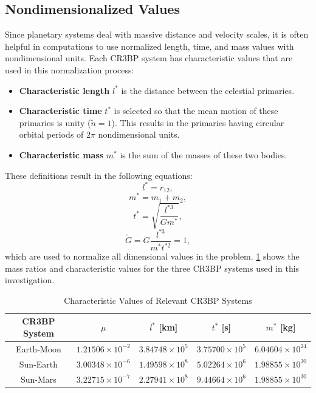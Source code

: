 \subsection{Nondimensionalized Values}
Since planetary systems deal with massive distance and velocity scales, it is often helpful in
computations to use normalized length, time, and mass values with nondimensional units. Each CR3BP
system has characteristic values that are used in this normalization process:
\begin{itemize}
    \item \textbf{Characteristic length} $l^{*}$ is the distance between the celestial primaries.
    \item \textbf{Characteristic time} $t^{*}$ is selected so that the mean motion of these
    primaries is unity ($\tilde{n}=1$). This results in the primaries having circular orbital
    periods of $2\pi$ nondimensional units.
    \item \textbf{Characteristic mass} $m^{*}$ is the sum of the masses of these two bodies.
\end{itemize}
These definitions result in the following equations:
\begin{equation}
    l^{*}=r_{12},
    \label{eq:lstar}
\end{equation}
\begin{equation}
    m^{*}=m_{1}+m_{2},
    \label{eq:mstar}
\end{equation}
\begin{equation}
    t^{*}=\sqrt{\frac{l^{*3}}{Gm^{*}}},
    \label{eq:tstar}
\end{equation}
\begin{equation}
    \tilde{G}=G\frac{l^{*3}}{m^{*}t^{*2}}=1,
    \label{eq:gstar}
\end{equation}
which are used to normalize all dimensional values in the problem. \cref{tab:charValues} shows the
mass ratios and characteristic values for the three CR3BP systems used in this investigation.

\begin{table}[ht]
    \centering
    \caption{Characteristic Values of Relevant CR3BP Systems}
    \begin{tabular}{|c|c|c|c|c|}
        \hline
        \textbf{CR3BP System}   &   \boldmath$\mu$          &   \boldmath$l^{*}$ \textbf{[km]}  &   \boldmath$t^{*}$ \textbf{[s]}   &   \boldmath$m^{*}$ \textbf{[kg]}  \\  \hline
        Earth-Moon              &   $1.21506\times10^{-2}$  &   $3.84748\times10^{5}$           &   $3.75700\times10^{5}$           &   $6.04604\times10^{24}$          \\  \hline
        Sun-Earth               &   $3.00348\times10^{-6}$  &   $1.49598\times10^{8}$           &   $5.02264\times10^{6}$           &   $1.98855\times10^{30}$          \\  \hline
        Sun-Mars                &   $3.22715\times10^{-7}$  &   $2.27941\times10^{8}$           &   $9.44664\times10^{6}$           &   $1.98855\times10^{30}$          \\  \hline
    \end{tabular}
    \label{tab:charValues}
\end{table}

